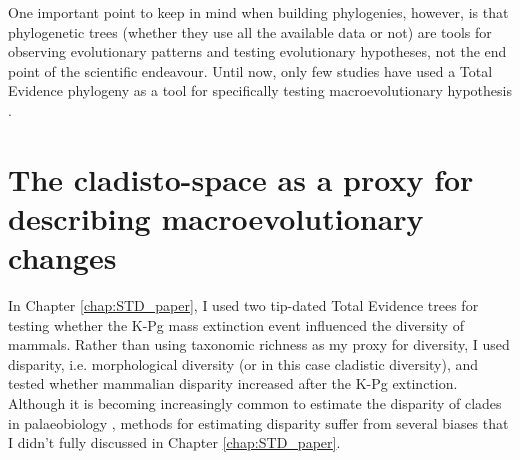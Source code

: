 One important point to keep in mind when building phylogenies, however, is that phylogenetic trees (whether they use all the available data or not) are tools for observing evolutionary patterns and testing evolutionary hypotheses, not the end point of the scientific endeavour.
Until now, only few studies have used a Total Evidence phylogeny as a tool for specifically testing macroevolutionary hypothesis \citep[e.g.][]{Slater2012MEE,Wood01032013,Dembo2015}.

\section{The cladisto-space as a proxy for describing macroevolutionary changes} %
In Chapter \ref{chap:STD_paper}, I used two tip-dated Total Evidence trees for testing whether the K-Pg mass extinction event influenced the diversity of mammals.
Rather than using taxonomic richness as my proxy for diversity, I used disparity, i.e. morphological diversity (or in this case cladistic diversity), and tested whether mammalian disparity increased after the K-Pg extinction.
Although it is becoming increasingly common to estimate the disparity of clades in palaeobiology \citep[e.g.][]{Butler2012,brusattedinosaur2012,toljagictriassic-jurassic2013,brusattegradual2014,bensonfaunal2014,Claddis,Close2015}, methods for estimating disparity suffer from several biases that I didn't fully discussed in Chapter \ref{chap:STD_paper}.

